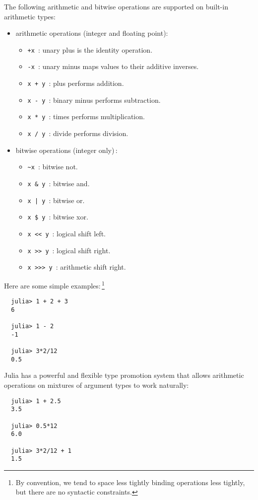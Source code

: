 \documentclass{article}
\begin{document}
The following arithmetic and bitwise operations are supported on built-in arithmetic types:
\begin{itemize}
  \item arithmetic operations (integer and floating point):
  \begin{itemize}
    \item \verb|+x|~: unary plus is the identity operation.
    \item \verb|-x|~: unary minus maps values to their additive inverses.
    \item \verb|x + y|~: plus performs addition.
    \item \verb|x - y|~: binary minus performs subtraction.
    \item \verb|x * y|~: times performs multiplication.
    \item \verb|x / y|~: divide performs division.
  \end{itemize}
  \item bitwise operations (integer only)\,:
  \begin{itemize}
    \item \verb|~x|~: bitwise not.
    \item \verb|x & y|~: bitwise and.
    \item \texttt{x | y}~: bitwise or.
    \item \verb|x $ y|~: bitwise xor.
    \item \verb|x << y|~: logical shift left.
    \item \verb|x >> y|~: logical shift right.
    \item \verb|x >>> y|~: arithmetic shift right.
  \end{itemize}
\end{itemize}
Here are some simple examples:\,\footnote{By convention, we tend to space less tightly binding operations less tightly, but there are no syntactic constraints.}
\begin{verbatim}
  julia> 1 + 2 + 3
  6

  julia> 1 - 2
  -1

  julia> 3*2/12
  0.5
\end{verbatim}
Julia has a powerful and flexible type promotion system that allows arithmetic operations on mixtures of argument types to work naturally:
\begin{verbatim}
  julia> 1 + 2.5
  3.5

  julia> 0.5*12
  6.0

  julia> 3*2/12 + 1
  1.5
\end{verbatim}
\end{document}
